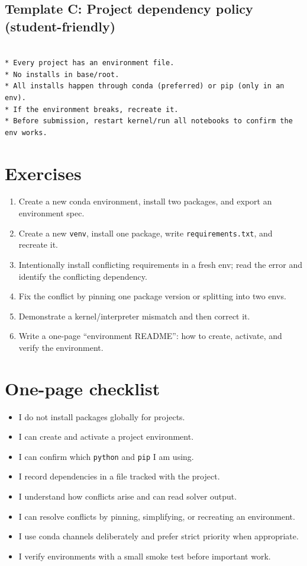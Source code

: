 \subsection{Template C: Project dependency policy (student-friendly)}
\begin{verbatim}

* Every project has an environment file.
* No installs in base/root.
* All installs happen through conda (preferred) or pip (only in an env).
* If the environment breaks, recreate it.
* Before submission, restart kernel/run all notebooks to confirm the env works.
  \end{verbatim}

\section{Exercises}
\begin{enumerate}
\item Create a new conda environment, install two packages, and export an environment spec.
\item Create a new \texttt{venv}, install one package, write \texttt{requirements.txt}, and recreate it.
\item Intentionally install conflicting requirements in a fresh env; read the error and identify the conflicting dependency.
\item Fix the conflict by pinning one package version or splitting into two envs.
\item Demonstrate a kernel/interpreter mismatch and then correct it.
\item Write a one-page ``environment README'': how to create, activate, and verify the environment.
\end{enumerate}

\section{One-page checklist}
\begin{itemize}
\item I do not install packages globally for projects.
\item I can create and activate a project environment.
\item I can confirm which \texttt{python} and \texttt{pip} I am using.
\item I record dependencies in a file tracked with the project.
\item I understand how conflicts arise and can read solver output.
\item I can resolve conflicts by pinning, simplifying, or recreating an environment.
\item I use conda channels deliberately and prefer strict priority when appropriate.
\item I verify environments with a small smoke test before important work.
\end{itemize}

